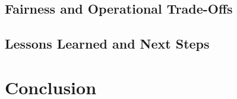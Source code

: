 \section{Fairness and Operational Trade-Offs}\label{sec:fairness}
\section{Lessons Learned and Next Steps}\label{sec:lessons}

\chapter{Conclusion}\label{ch:conclusion}
